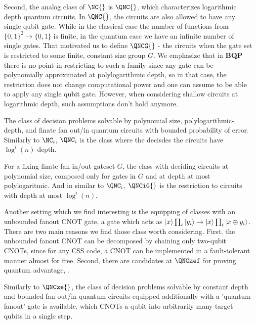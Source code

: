 Second, the analog class of $\NC{}$ is $\QNC{}$, which characterizes logarithmic depth quantum circuits. In $\QNC{}$, the circuits are also allowed to have any single qubit gate. While in the classical case the number of functions from $\{0,1\}^{2} \rightarrow \{0,1\}$ is finite, in the quantum case we have an infinite number of single gates. That motivated us to define $\QNCG{}$ - the circuits when the gate set is restricted to some finite, constant size group $G$. We emphasize that in \textbf{BQP} there is no point in restricting to such a family since any gate can be polynomially approximated at polylogarithmic depth, so in that case, the restriction does not change computational power and one can assume to be able to apply any single qubit gate. However, when considering shallow circuits at logarithmic depth, such assumptions don't hold anymore.
\begin{definition}[$\QNC{}$]
  The class of decision problems solvable by polynomial size,  polylogarithmic-depth,  and finate fan out/in quantum circuits with bounded probability of error. Similarly to $\NC_i{}$, $\QNC_i{}$ is the class where the decisdes the circuits have $\log^i (n)$ depth.  
\end{definition}

\begin{definition}[$\QNCG{}$]
  For a fixing finate fan in/out gateset $G$, the class with deciding circuits at polynomial size, composed only for gates in $G$ and at depth at most polylogaritmic. And in similar to $\QNC_{i}{}$, $\QNCiG{}$ is the restriction to circuits with depth at most $\log^{i}(n)$.  
\end{definition}

Another setting which we find interesting is the equipping of classes with an unbounded fanout CNOT gate, a gate which acts as $\ket{x}\prod_{i}\ket{y_{i}} \rightarrow \ket{x}\prod_{i}\ket{x \oplus y_{i}}$. There are two main reasons we find those class worth considering. First, the unbounded fanout CNOT can be decomposed by chaining only two-qubit CNOTs, since for any CSS code, a CNOT can be implemented in a fault-tolerant manner almost for free. Second, there are candidates at $\QNCzef$ for proving quantum advantage\cite{Bremner_2017}, \cite{Paletta_2024}.


\begin{definition}[$\QNCzef{}$] 
Similarly to $\QNCze{}$, the class of decision problems solvable by constant depth and bounded fan out/in quantum circuits equipped additionally with a 'quantum fanout' gate is available, which CNOTs a qubit into arbitrarily many target qubits in a single step.
\end{definition}

